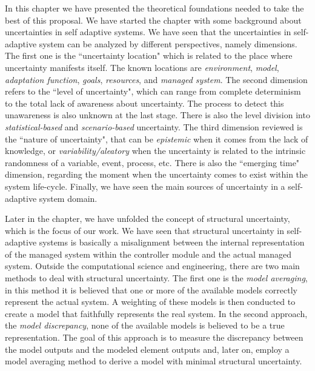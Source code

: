 In this chapter we have presented the theoretical foundations needed to take the best of this proposal. We have started the chapter with some background about uncertainties in self adaptive systems. We have seen that the uncertainties in self-adaptive system can be analyzed by different perspectives, namely dimensions. The first one is the ``uncertainty location" which is related to the place where uncertainty manifests itself. The known locations are \textit{environment}, \textit{model}, \textit{adaptation function}, \textit{goals}, \textit{resources}, and \textit{managed system}. The second dimension refers to the ``level of uncertainty", which can range from complete determinism to the total lack of awareness about uncertainty. The process to detect this unawareness is also unknown at the last stage. There is also the level division into \textit{statistical-based} and \textit{scenario-based} uncertainty. The third dimension reviewed is the ``nature of uncertainty", that can be \textit{epistemic} when it comes from the lack of knowledge, or \textit{variability/aleatory} when the uncertainty is related to the intrinsic randomness of a variable, event, process, etc. There is also the ``emerging time" dimension, regarding the moment when the uncertainty comes to exist within the system life-cycle. Finally, we have seen the main sources of uncertainty in a self-adaptive system domain.

Later in the chapter, we have unfolded the concept of structural uncertainty, which is the focus of our work. We have seen that structural uncertainty in self-adaptive systems is basically a misalignment between the internal representation of the managed system within the controller module and the actual managed system. Outside the computational science and engineering, there are two main methods to deal with structural uncertainty. The first one is the \textit{model averaging}, in this method it is believed that one or more of the available models correctly represent the actual system. A weighting of these models is then conducted to create a model that faithfully represents the real system. In the second approach, the \textit{model discrepancy}, none of the available models is believed to be a true representation. The goal of this approach is to measure the discrepancy between the model outputs and the modeled element outputs and, later on, employ a model averaging method to derive a model with minimal structural uncertainty.

